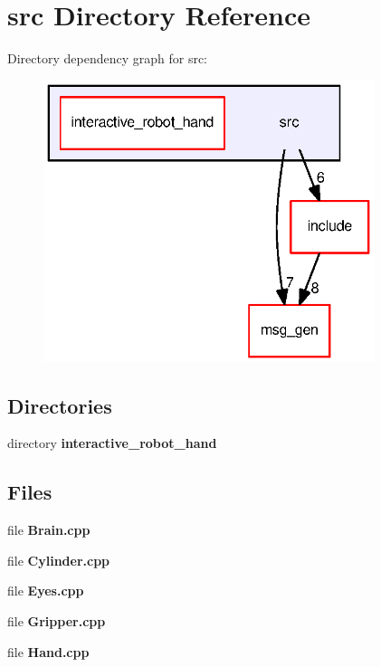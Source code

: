 \section{src Directory Reference}
\label{dir_68267d1309a1af8e8297ef4c3efbcdba}
Directory dependency graph for src\-:
\nopagebreak
\begin{figure}[H]
\begin{center}
\leavevmode
\includegraphics[width=274pt]{dir_68267d1309a1af8e8297ef4c3efbcdba_dep}
\end{center}
\end{figure}
\subsection*{Directories}
\begin{DoxyCompactItemize}
\item 
directory {\bf interactive\-\_\-robot\-\_\-hand}
\end{DoxyCompactItemize}
\subsection*{Files}
\begin{DoxyCompactItemize}
\item 
file {\bf Brain.\-cpp}
\item 
file {\bf Cylinder.\-cpp}
\item 
file {\bf Eyes.\-cpp}
\item 
file {\bf Gripper.\-cpp}
\item 
file {\bf Hand.\-cpp}
\end{DoxyCompactItemize}
